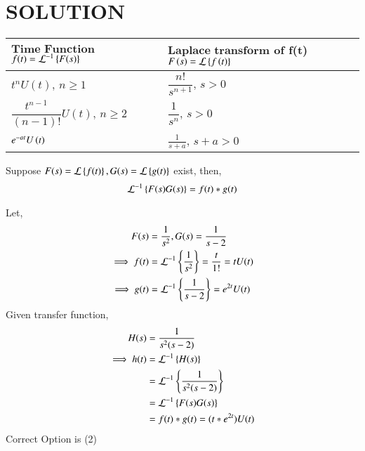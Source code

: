 \documentclass[journal,12pt,twocolumn]{IEEEtran}
\begin{document}
\section{SOLUTION}
%
\begin{lemma}\label{tbl}
\begin{center}
\begin{tabular}{ |m{4cm}|m{4.5cm}| } 
 \hline
 $\textbf{Time Function}$ $f(t)=\mathcal{L}^{-1}\left\{F(s)\right\}$ & $\textbf{Laplace transform}$ of f(t) $F\left(s\right)=\mathcal{L}\left\{f\left(t\right)\right\}$ \\ 
 \hline
 $t^{n}U(t)$, $n \ge 1$ & $\dfrac{n!}{s^{n+1}}$, $s>0$ \\ 
 \hline
 $\dfrac{t^{n-1}}{(n-1)!}U(t)$, $n \ge 2$ & $\dfrac{1}{s^n}$, $s > 0$ \\
 \hline
 $e^{-at}U\left(t\right)$ & $\frac{1}{s+a}$, $s+a>0$\\
 \hline
\end{tabular}
\end{center}
\end{lemma}
\begin{theorem}
Suppose $F(s)=\mathcal{L}\left\{f(t)\right\}, G(s)=\mathcal{L}\left\{g(t)\right\}$ exist, then,
\begin{align}
    \mathcal{L}^{-1}\left\{F(s)G(s)\right\}=f(t)*g(t)\label{eq:cuf}
\end{align}
\end{theorem}
Let,
\begin{align}
    F(s) &= \frac{1}{s^2}, G(s) = \frac{1}{s-2}\\
    \implies f(t) &= \mathcal{L}^{-1}\left\{\frac{1}{s^2}\right\} = \frac{t}{1!} = tU(t)\\
    \implies g(t) &= \mathcal{L}^{-1}\left\{\frac{1}{s-2}\right\} = e^{2t}U(t)
\end{align}
Given transfer function,
\begin{align}
   H(s) &= \frac{1}{s^2(s-2)} \\
   \implies h(t) &=  \mathcal{L}^{-1}\left\{H(s)\right\}  \\
   &= \mathcal{L}^{-1}\left\{\frac{1}{s^2(s-2)}\right\}\label{eq:1}\\
   &= \mathcal{L}^{-1}\left\{F(s)G(s)\right\}\\
   &= f(t)*g(t)
   = (t*e^{2t})U(t)
\end{align}
Correct Option is (2)
\end{document}
